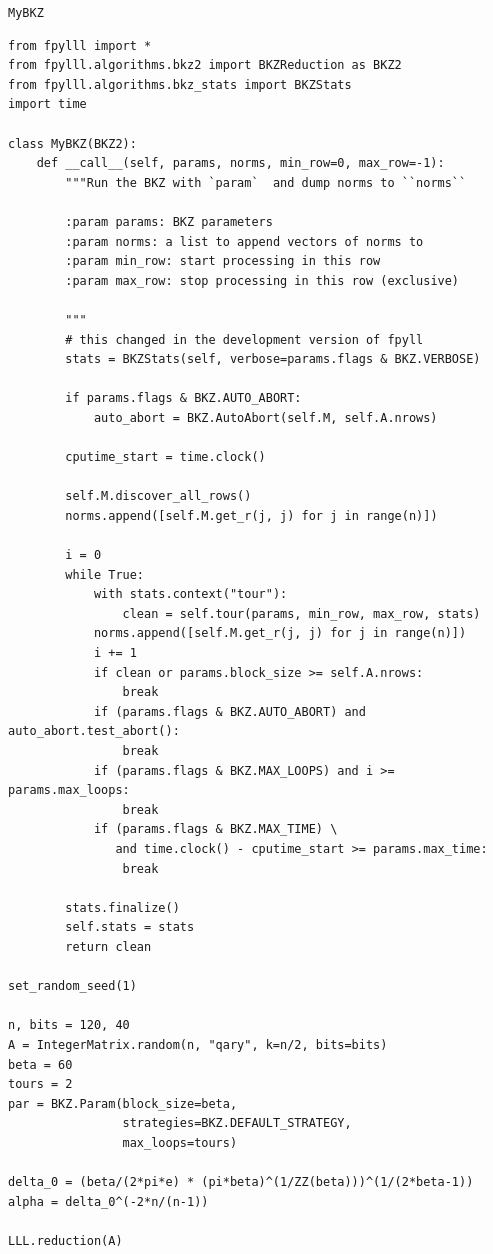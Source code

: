 \documentclass[10pt,a4paper,nobib]{tufte-handout}
\begin{document}
\texttt{MyBKZ}

\lstset{language=sage,label= ,caption= ,captionpos=b,numbers=none}
\begin{lstlisting}
from fpylll import *
from fpylll.algorithms.bkz2 import BKZReduction as BKZ2
from fpylll.algorithms.bkz_stats import BKZStats
import time

class MyBKZ(BKZ2):
    def __call__(self, params, norms, min_row=0, max_row=-1):
        """Run the BKZ with `param`  and dump norms to ``norms``

        :param params: BKZ parameters
        :param norms: a list to append vectors of norms to
        :param min_row: start processing in this row
        :param max_row: stop processing in this row (exclusive)

        """
        # this changed in the development version of fpyll
        stats = BKZStats(self, verbose=params.flags & BKZ.VERBOSE)

        if params.flags & BKZ.AUTO_ABORT:
            auto_abort = BKZ.AutoAbort(self.M, self.A.nrows)

        cputime_start = time.clock()

        self.M.discover_all_rows()
        norms.append([self.M.get_r(j, j) for j in range(n)])

        i = 0
        while True:
            with stats.context("tour"):
                clean = self.tour(params, min_row, max_row, stats)
            norms.append([self.M.get_r(j, j) for j in range(n)])
            i += 1
            if clean or params.block_size >= self.A.nrows:
                break
            if (params.flags & BKZ.AUTO_ABORT) and auto_abort.test_abort():
                break
            if (params.flags & BKZ.MAX_LOOPS) and i >= params.max_loops:
                break
            if (params.flags & BKZ.MAX_TIME) \
               and time.clock() - cputime_start >= params.max_time:
                break
            
        stats.finalize()
        self.stats = stats
        return clean

set_random_seed(1)

n, bits = 120, 40
A = IntegerMatrix.random(n, "qary", k=n/2, bits=bits)
beta = 60
tours = 2
par = BKZ.Param(block_size=beta,
                strategies=BKZ.DEFAULT_STRATEGY,
                max_loops=tours) 

delta_0 = (beta/(2*pi*e) * (pi*beta)^(1/ZZ(beta)))^(1/(2*beta-1))
alpha = delta_0^(-2*n/(n-1))

LLL.reduction(A)


\end{lstlisting}
\end{document}
